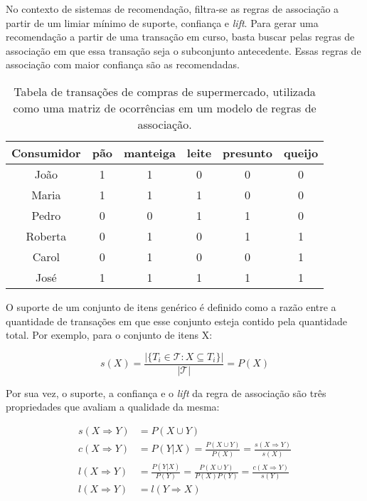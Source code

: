 No contexto de sistemas de recomendação, filtra-se as regras de associação a partir
de um limiar mínimo de suporte, confiança e \textit{lift}. Para gerar uma recomendação
a partir de uma transação em curso, basta buscar pelas regras de associação em
que essa transação seja o subconjunto antecedente. Essas regras de associação com maior
confiança são as recomendadas.

\begin{table}
\begin{center}
    \begin{tabular}{|c|c|c|c|c|c|}
        \hline
        \textbf{Consumidor} & pão & manteiga & leite & presunto & queijo \\
        \hline
        João & 1 & 1 & 0 & 0 & 0 \\
        Maria & 1 & 1 & 1 & 0 & 0 \\
        Pedro & 0 & 0 & 1 & 1 & 0 \\
        Roberta & 0 & 1 & 0 & 1 & 1 \\
        Carol & 0 & 1 & 0 & 0 & 1 \\
        José & 1 & 1 & 1 & 1 & 1 \\
        \hline
    \end{tabular}
    \label{tab:transactions}
\end{center}
\caption{Tabela de transações de compras de supermercado, utilizada como uma matriz de ocorrências em um modelo de regras de associação.}
\end{table}


O suporte de um conjunto de itens genérico é definido como a razão entre a
quantidade de transações em que esse conjunto esteja contido pela quantidade
total. Por exemplo, para o conjunto de itens X:

\begin{equation}
s(X) = \frac{|\{T_i \in \mathcal{T} : X \subseteq T_i\}|}{|\mathcal{T}|} = P(X)
\end{equation}

Por sua vez, o suporte, a confiança e o \textit{lift} da regra de associação são três
propriedades que avaliam a qualidade da mesma:

\begin{align}
    s(X \Rightarrow Y) &= P( X \cup Y ) \\
    c(X \Rightarrow Y) &= P(Y|X) = \frac{P(X \cup Y)}{P(X)} = \frac{s(X \Rightarrow Y)}{s(X)}  \\
    l(X \Rightarrow Y) &= \frac{P(Y|X)}{P(Y)} = \frac{P(X \cup Y)}{P(X)P(Y)} = \frac{c(X \Rightarrow Y)}{s(Y)}\\
    l(X \Rightarrow Y) &= l(Y \Rightarrow X) 
\end{align}

